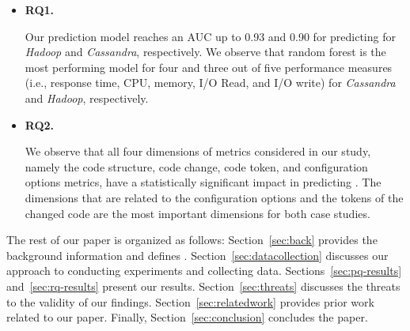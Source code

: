 \begin{itemize}
    
    \item \textbf{RQ1. \RQII}
    
    Our prediction model reaches an AUC up to 0.93 and 0.90 for predicting \inconsistent for \emph{Hadoop} and \emph{Cassandra}, respectively. We observe that random forest is the most performing model for four and three out of five performance measures (i.e., response time, CPU, memory, I/O Read, and I/O write) for \emph{Cassandra} and \emph{Hadoop}, respectively. 
    
    \item\textbf{RQ2. \RQIII}
    
    We observe that all four dimensions of metrics considered in our study, namely the code structure, code change, code token, and configuration options metrics, have a statistically significant impact in predicting \inconsistent. The dimensions that are related to the configuration options and the tokens of the changed code are the most important dimensions for both case studies. 
    
\end{itemize}

 The rest of our paper is organized as follows: Section~\ref{sec:back} provides the background information and defines \inconsistent. Section~\ref{sec:datacollection} discusses our approach to conducting experiments and collecting data. Sections~\ref{sec:pq-results} and~\ref{sec:rq-results} present our results. Section~\ref{sec:threats} discusses the threats to the validity of our findings. Section~\ref{sec:relatedwork} provides prior work related to our paper. Finally, Section~\ref{sec:conclusion} concludes the paper.


